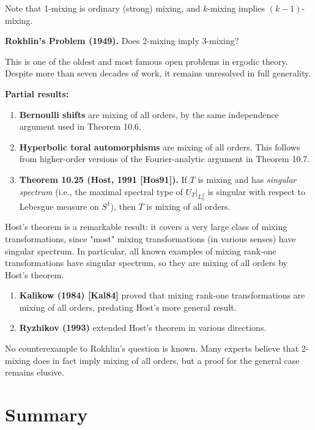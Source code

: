 Note that 1-mixing is ordinary (strong) mixing, and $k$-mixing implies $(k-1)$-mixing.

\textbf{Rokhlin's Problem (1949).} Does 2-mixing imply 3-mixing?

This is one of the oldest and most famous open problems in ergodic theory. Despite more than seven decades of work, it remains unresolved in full generality.

\textbf{Partial results:}

\begin{enumerate}[nosep]
  \item \textbf{Bernoulli shifts} are mixing of all orders, by the same independence argument used in Theorem 10.6.

  \item \textbf{Hyperbolic toral automorphisms} are mixing of all orders. This follows from higher-order versions of the Fourier-analytic argument in Theorem 10.7.

  \item \textbf{Theorem 10.25 (Host, 1991 [Hos91]).} If $T$ is mixing and has \textit{singular spectrum} (i.e., the maximal spectral type of $U_T|_{L^2_0}$ is singular with respect to Lebesgue measure on $S^1$), then $T$ is mixing of all orders.
\end{enumerate}

Host's theorem is a remarkable result: it covers a very large class of mixing transformations, since "most" mixing transformations (in various senses) have singular spectrum. In particular, all known examples of mixing rank-one transformations have singular spectrum, so they are mixing of all orders by Host's theorem.

\begin{enumerate}[nosep]
  \item \textbf{Kalikow (1984) [Kal84]} proved that mixing rank-one transformations are mixing of all orders, predating Host's more general result.

  \item \textbf{Ryzhikov (1993)} extended Host's theorem in various directions.
\end{enumerate}

No counterexample to Rokhlin's question is known. Many experts believe that 2-mixing does in fact imply mixing of all orders, but a proof for the general case remains elusive.


\section{Summary}\label{sec:10.8}


